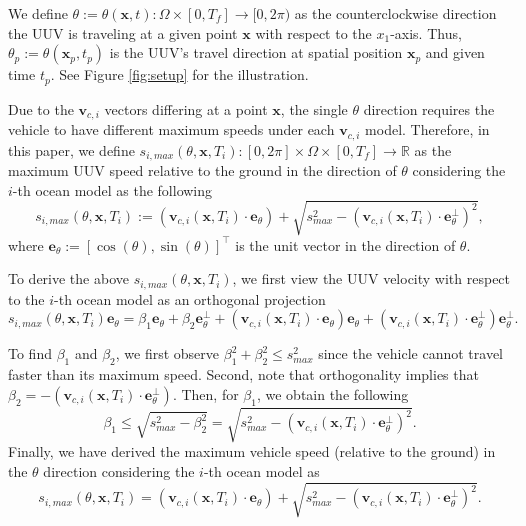 \documentclass[pdflatex,sn-mathphys-num]{sn-jnl}%
\def \bx{{\mathbf {x}}}
\def \bv{{\mathbf {v}}}
\def \be{{\mathbf {e}}}
\theoremstyle{thmstyleone}%
\theoremstyle{thmstyletwo}%
\theoremstyle{thmstylethree}%
\begin{document}
We define $\theta := \theta(\bx,t): \Omega \times [0,T_f] \rightarrow [0,2\pi)$ as the counterclockwise direction the UUV is traveling at a given point $\bx$ with respect to the $x_1$-axis.  Thus, $\theta_p:= \theta(\bx_p,t_p)$ is the UUV's travel direction at spatial position $\bx_p$ and given time $t_p$.  See Figure \ref{fig:setup} for the illustration.

Due to the $\bv_{c,i}$ vectors differing at a point $\bx$, the single $\theta$ direction requires the vehicle to have different maximum speeds under each $\bv_{c,i}$ model.  Therefore, in this paper, we define $s_{i,max}(\theta,\bx,T_i): [0,2\pi] \times \Omega \times [0,T_f] \rightarrow \mathbb{R}$ as the maximum UUV speed relative to the ground in the direction of $\theta$ considering the $i$-th ocean model as the following
\begin{equation}
s_{i,max}(\theta,\bx,T_i) := (\bv_{c,i}(\bx,T_i) \cdot \be_\theta) + \sqrt{s^2_{max} - (\bv_{c,i}(\bx,T_i) \cdot \be_\theta^\perp)^2},
\label{eqn:speed}
\end{equation}
where $\be_\theta := [\cos(\theta),\sin(\theta)]^\top$ is the unit vector in the direction of $\theta$.

To derive the above $s_{i,max}(\theta, \bx, T_i)$, we first view the UUV velocity with respect to the $i$-th ocean model as an orthogonal projection
\begin{equation}
s_{i,max}(\theta,\bx,T_i) \be_{\theta} = \beta_1 \be_\theta + \beta_2 \be_\theta^\perp + (\bv_{c,i} (\bx,T_i) \cdot \be_\theta)\be_\theta + (\bv_{c,i}(\bx,T_i)\cdot \be_\theta^\perp)\be_\theta^\perp.
\end{equation}


To find $\beta_1$ and $\beta_2$, we first observe $\beta_1^2 + \beta_2^2 \leq s_{max}^2$ since the vehicle cannot travel faster than its maximum speed. Second, note that orthogonality implies that $\beta_2 = -(\bv_{c,i}(\bx,T_i) \cdot \be_\theta^\perp)$.
Then, for $\beta_1$, we obtain the following 
\begin{equation}
\beta_1 \leq \sqrt{s_{max}^2-\beta_2^2} =\sqrt{s_{max}^2 -(\bv_{c,i}(\bx,T_i) \cdot \be_\theta^\perp)^2}.
\end{equation}
Finally,  we have derived 
the maximum vehicle speed (relative to the ground) in the $\theta$ direction considering the $i$-th ocean model as
$$
s_{i,max}(\theta,\bx,T_i) = (\bv_{c,i}(\bx,T_i) \cdot \be_\theta) + \sqrt{s^2_{max} - (\bv_{c,i}(\bx,T_i) \cdot \be_\theta^\perp)^2}.
$$
\end{document}
